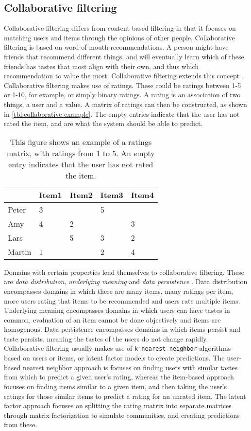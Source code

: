 \subsection{Collaborative filtering}
Collaborative filtering differs from content-based filtering in that it focuses on matching users and items through the opinions of other people.
Collaborative filtering is based on word-of-mouth recommendations.
A person might have friends that recommend different things, and will eventually learn which of these friends has tastes that most align with their own, and thus which recommendation to value the most.
Collaborative filtering extends this concept \cite{CollaborativeFiltering}.
Collaborative filtering makes use of ratings.
These could be ratings between 1-5 or 1-10, for example, or simply binary ratings.
A rating is an association of two things, a user and a value.
A matrix of ratings can then be constructed, as shown in \autoref{tbl:collaborative-example}.
The empty entries indicate that the user has not rated the item, and are what the system should be able to predict.
\begin{table}[H]
    \centering
    \begin{tabular}{|l|l|l|l|l|}
    \hline
           & Item1 & Item2 & Item3 & Item4 \\ \hline
    Peter  & 3     &       & 5     &       \\ \hline
    Amy    & 4     & 2     &       & 3     \\ \hline
    Lars   &       & 5     & 3     & 2     \\ \hline
    Martin & 1     &       & 2     & 4     \\ \hline
    \end{tabular}
    \caption{This figure shows an example of a ratings matrix, with ratings from 1 to 5. An empty entry indicates that the user has not rated the item.}
    \label{tbl:collaborative-example}
\end{table}
Domains with certain properties lend themselves to collaborative filtering. 
These are \textit{data distribution}, \textit{underlying meaning} and \textit{data persistence} \cite{CollaborativeFiltering}.
Data distribution encompasses domains in which there are many items, many ratings per item, more users rating that items to be recommended and users rate multiple items.
Underlying meaning encompasses domains in which users can have tastes in common, evaluation of an item cannot be done objectively and items are homogenous.
Data persistence encompasses domains in which items persist and taste persists, meaning the tastes of the users do not change rapidly.
Collaborative filtering usually makes use of \texttt{k nearest neighbor} algorithms based on users or items, or latent factor models to create predictions.
The user-based nearest neighbor approach is focuses on finding users with similar tastes from which to predict a given user's rating, whereas the item-based approach focuses on finding items similar to a given item, and then taking the user's ratings for those similar items to predict a rating for an unrated item.
The latent factor approach focuses on splitting the rating matrix into separate matrices through matrix factorization to simulate communities, and creating predictions from these.


